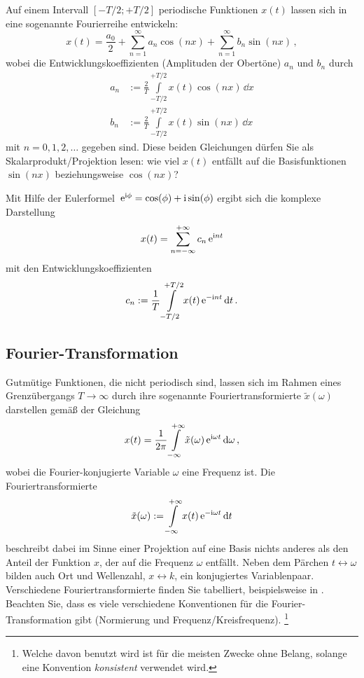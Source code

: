 \documentclass[paper=a4, fontsize=11.0pt, abstractoff, DIV12]{scrartcl}
\begin{document}
Auf einem Intervall $[-T/2; +T/2]$ periodische Funktionen $x(t)$
lassen sich in eine sogenannte Fourierreihe entwickeln:
\begin{equation}
x(t) = \frac{a_0}{2}+\sum\limits_{n=1}^{\infty}a_n\cos(nx) + \sum\limits_{n=1}^{\infty}b_n\sin(nx)\,,
\end{equation}
wobei die Entwicklungskoeffizienten (Amplituden der \glqq Obertöne\grqq)
$a_n$ und $b_n$ durch
\begin{align}
a_n &:= \frac{2}{T}\int\limits_{-T/2}^{+T/2}x(t)\cos(nx)\,\dd x\\
b_n &:= \frac{2}{T}\int\limits_{-T/2}^{+T/2}x(t)\sin(nx)\,\dd x
\end{align}
mit $n=0,1,2,\dots$ gegeben sind. Diese beiden Gleichungen dürfen Sie als
Skalarprodukt/Projektion lesen: \glqq wie viel $x(t)$ entfällt auf die
Basisfunktionen $\sin(nx)$ beziehungsweise $\cos(nx)$?\grqq

Mit Hilfe der Eulerformel $\,{\mathrm{e}}^{\mathrm{i}\phi}=\cos(\phi)+\mathrm{i}\sin(\phi)$ ergibt
sich die komplexe Darstellung
\begin{equation}
x(t) = \sum\limits_{n=-\infty}^{+\infty}c_n\,{\mathrm{e}}^{\mathrm{i} n t}
\end{equation}
mit den Entwicklungskoeffizienten
\begin{equation}
c_n := \frac{1}{T}\int\limits_{-T/2}^{+T/2}x(t)\,{\mathrm{e}}^{-\mathrm{i} n t}\,\mathrm{d} t\,.
\end{equation}

\subsection{Fourier-Transformation}

Gutmütige Funktionen, die nicht periodisch sind, lassen sich im Rahmen eines
Grenzübergangs $T\to\infty$ durch ihre sogenannte Fouriertransformierte
$\tilde x(\omega)$ darstellen gemäß der Gleichung
\begin{equation}
x(t) = \frac{1}{2\pi}\int\limits_{-\infty}^{+\infty} \tilde x(\omega) \,{\mathrm{e}}^{\mathrm{i} \omega t}\,\mathrm{d}\omega\,,
\label{eq:IFT}
\end{equation}
wobei die Fourier-konjugierte Variable $\omega$ eine Frequenz ist. Die
Fouriertransformierte
\begin{equation}
\tilde x(\omega) := \int\limits_{-\infty}^{+\infty}x(t) \,{\mathrm{e}}^{-\mathrm{i} \omega t}\,\mathrm{d} t
\label{eq:FT}
\end{equation}
beschreibt dabei im Sinne einer Projektion auf eine Basis nichts anderes als
den Anteil der Funktion $x$, der auf die Frequenz $\omega$ entfällt. Neben
dem Pärchen $t \leftrightarrow \omega$ bilden auch Ort und Wellenzahl, $x
\leftrightarrow k$, ein konjugiertes Variablenpaar. Verschiedene
Fouriertransformierte finden Sie tabelliert, beispielsweise in \cite
{Gradshteyn}. Beachten Sie, dass es viele verschiedene Konventionen für die
Fourier-Transformation gibt (Normierung und Frequenz/Kreisfrequenz).
\footnote {Welche davon benutzt wird ist für die meisten Zwecke ohne Belang,
solange eine Konvention \emph{konsistent} verwendet wird.}
\end{document}
